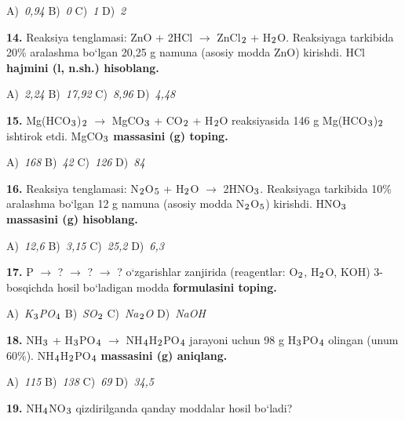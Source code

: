 \documentclass[11pt,a4paper]{article}
\renewcommand{\textsubscript}[1]{\ensuremath{_{\text{\fontsize{8}{8}\selectfont #1}}}}
\begin{document}
\begin{multicols}{2}
\noindent A)~\textsl{0,94} \hfill B)~\textsl{0} \hfill C)~\textsl{1} \hfill D)~\textsl{2}\par
\vspace{4pt}
\noindent\textbf{14.} Reaksiya tenglamasi: ZnO + 2HCl $\to$ ZnCl\textsubscript{2} + H\textsubscript{2}O. Reaksiyaga tarkibida 20\% aralashma bo`lgan 20,25 g namuna (asosiy modda ZnO) kirishdi. HCl \textbf{hajmini (l, n.sh.) hisoblang.}

\noindent A)~\textsl{2,24} \hfill B)~\textsl{17,92} \hfill C)~\textsl{8,96} \hfill D)~\textsl{4,48}\par
\vspace{4pt}
\noindent\textbf{15.} Mg(HCO\textsubscript{3})\textsubscript{2} $\to$ MgCO\textsubscript{3} + CO\textsubscript{2} + H\textsubscript{2}O reaksiyasida 146 g Mg(HCO\textsubscript{3})\textsubscript{2} ishtirok etdi. MgCO\textsubscript{3} \textbf{massasini (g) toping.}

\noindent A)~\textsl{168} \hfill B)~\textsl{42} \hfill C)~\textsl{126} \hfill D)~\textsl{84}\par
\vspace{4pt}
\noindent\textbf{16.} Reaksiya tenglamasi: N\textsubscript{2}O\textsubscript{5} + H\textsubscript{2}O $\to$ 2HNO\textsubscript{3}. Reaksiyaga tarkibida 10\% aralashma bo`lgan 12 g namuna (asosiy modda N\textsubscript{2}O\textsubscript{5}) kirishdi. HNO\textsubscript{3} \textbf{massasini (g) hisoblang.}

\noindent A)~\textsl{12,6} \hfill B)~\textsl{3,15} \hfill C)~\textsl{25,2} \hfill D)~\textsl{6,3}\par
\vspace{4pt}
\noindent\textbf{17.} P $\to$ ? $\to$ ? $\to$ ? o`zgarishlar zanjirida (reagentlar: O\textsubscript{2}, H\textsubscript{2}O, KOH) 3-bosqichda hosil bo`ladigan modda \textbf{formulasini toping.}

\noindent A)~\textsl{K\textsubscript{3}PO\textsubscript{4}} \hfill B)~\textsl{SO\textsubscript{2}} \hfill C)~\textsl{Na\textsubscript{2}O} \hfill D)~\textsl{NaOH}\par
\vspace{4pt}
\noindent\textbf{18.} NH\textsubscript{3} + H\textsubscript{3}PO\textsubscript{4} $\to$ NH\textsubscript{4}H\textsubscript{2}PO\textsubscript{4} jarayoni uchun 98 g H\textsubscript{3}PO\textsubscript{4} olingan (unum 60\%). NH\textsubscript{4}H\textsubscript{2}PO\textsubscript{4} \textbf{massasini (g) aniqlang.}

\noindent A)~\textsl{115} \hfill B)~\textsl{138} \hfill C)~\textsl{69} \hfill D)~\textsl{34,5}\par
\vspace{4pt}
\noindent\textbf{19.} NH\textsubscript{4}NO\textsubscript{3} qizdirilganda qanday moddalar hosil bo`ladi?


\end{multicols}
\end{document}
